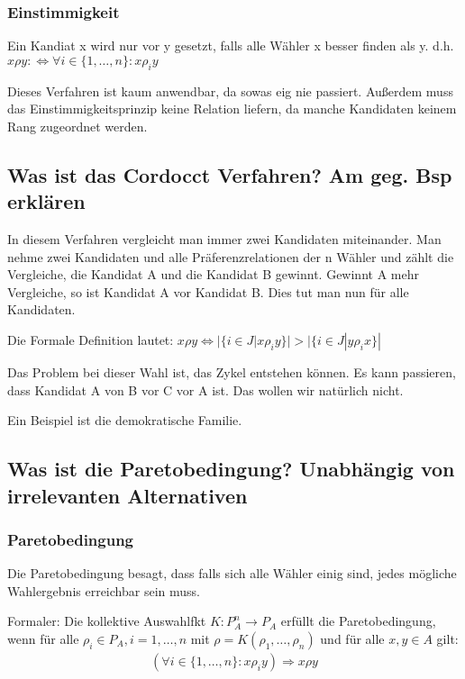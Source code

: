 \documentclass[]{article}
\begin{document}
\subsubsection*{Einstimmigkeit}
 Ein Kandiat x wird nur vor y gesetzt, falls alle Wähler x besser finden als y. d.h. $x \rho y : \Leftrightarrow \forall i \in \{1, \dots, n\}: x \rho_i y$
 
 Dieses Verfahren ist kaum anwendbar, da sowas eig nie passiert. Außerdem muss das Einstimmigkeitsprinzip keine Relation liefern, da manche Kandidaten keinem Rang zugeordnet werden. 

\subsection*{Was ist das Cordocct Verfahren? Am geg. Bsp erklären}
 In diesem Verfahren vergleicht man immer zwei Kandidaten miteinander. Man nehme zwei Kandidaten und alle Präferenzrelationen der n Wähler und zählt die Vergleiche, die Kandidat A und die Kandidat B gewinnt. Gewinnt A mehr Vergleiche, so ist Kandidat A vor Kandidat B. Dies tut man nun für alle Kandidaten.
 
 Die Formale Definition lautet: $x \rho y  \Leftrightarrow |\{i \in J| x \rho_i y \} | > | \{ i \in J| y \rho_i x \} | $
 
 Das Problem bei dieser Wahl ist, das Zykel entstehen können. Es kann passieren, dass Kandidat A von B vor C vor A ist. Das wollen wir natürlich nicht.
 
 Ein Beispiel ist die demokratische Familie. 

\subsection*{Was ist die Paretobedingung? Unabhängig von irrelevanten Alternativen}


\subsubsection*{Paretobedingung}
Die Paretobedingung besagt, dass falls sich alle Wähler einig sind, jedes mögliche Wahlergebnis erreichbar sein muss.

Formaler: Die kollektive Auswahlfkt $K:P_A^n \rightarrow P_A$ erfüllt die Paretobedingung, wenn für alle  $\rho_i \in P_A, i=1, \dots, n$ mit $\rho = K(\rho_1, \dots, \rho_n)$ und für alle $x,y \in A$ gilt:
\begin{align*}
\left( \forall i \in \{1, \dots, n \} : x \rho_i y \right) \Rightarrow x \rho y \label{Pareto-Bedingung}
\end{align*} 
\end{document}
